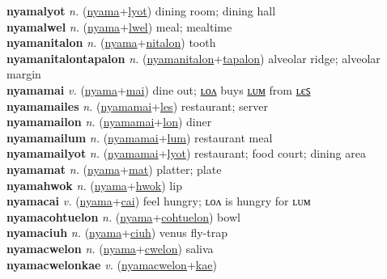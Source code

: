 \textbf{nyamalyot} \textit{n.} (\hyperref[nyama]{nyama}+\hyperref[lyot]{lyot})
dining room; dining hall \label{nyamalyot} \\
\textbf{nyamalwel} \textit{n.} (\hyperref[nyama]{nyama}+\hyperref[lwel]{lwel})
meal; mealtime \label{nyamalwel} \\
\textbf{nyamanitalon} \textit{n.} (\hyperref[nyama]{nyama}+\hyperref[nitalon]{nitalon})
tooth \label{nyamanitalon} \\
\textbf{nyamanitalontapalon} \textit{n.} (\hyperref[nyamanitalon]{nyamanitalon}+\hyperref[tapalon]{tapalon})
alveolar ridge; alveolar margin \label{nyamanitalontapalon} \\
\textbf{nyamamai} \textit{v.} (\hyperref[nyama]{nyama}+\hyperref[mai]{mai})
dine out; \hyperref[nyamamailon]{ʟᴏᴧ} buys \hyperref[nyamamailum]{ʟᴜᴍ} from \hyperref[nyamamailes]{ʟєꜱ} \label{nyamamai} \\
\textbf{nyamamailes} \textit{n.} (\hyperref[nyamamai]{nyamamai}+\hyperref[les]{les})
restaurant; server \label{nyamamailes} \\
\textbf{nyamamailon} \textit{n.} (\hyperref[nyamamai]{nyamamai}+\hyperref[lon]{lon})
diner \label{nyamamailon} \\
\textbf{nyamamailum} \textit{n.} (\hyperref[nyamamai]{nyamamai}+\hyperref[lum]{lum})
restaurant meal \label{nyamamailum} \\
\textbf{nyamamailyot} \textit{n.} (\hyperref[nyamamai]{nyamamai}+\hyperref[lyot]{lyot})
restaurant; food court; dining area \label{nyamamailyot} \\
\textbf{nyamamat} \textit{n.} (\hyperref[nyama]{nyama}+\hyperref[mat]{mat})
platter; plate \label{nyamamat} \\
\textbf{nyamahwok} \textit{n.} (\hyperref[nyama]{nyama}+\hyperref[hwok]{hwok})
lip \label{nyamahwok} \\
\textbf{nyamacai} \textit{v.} (\hyperref[nyama]{nyama}+\hyperref[cai]{cai})
feel hungry; ʟᴏᴧ is hungry for ʟᴜᴍ \label{nyamacai} \\
\textbf{nyamacohtuelon} \textit{n.} (\hyperref[nyama]{nyama}+\hyperref[cohtuelon]{cohtuelon})
bowl \label{nyamacohtuelon} \\
\textbf{nyamaciuh} \textit{n.} (\hyperref[nyama]{nyama}+\hyperref[ciuh]{ciuh})
venus fly-trap \label{nyamaciuh} \\
\textbf{nyamacwelon} \textit{n.} (\hyperref[nyama]{nyama}+\hyperref[cwelon]{cwelon})
saliva \label{nyamacwelon} \\
\textbf{nyamacwelonkae} \textit{v.} (\hyperref[nyamacwelon]{nyamacwelon}+\hyperref[kae]{kae})
